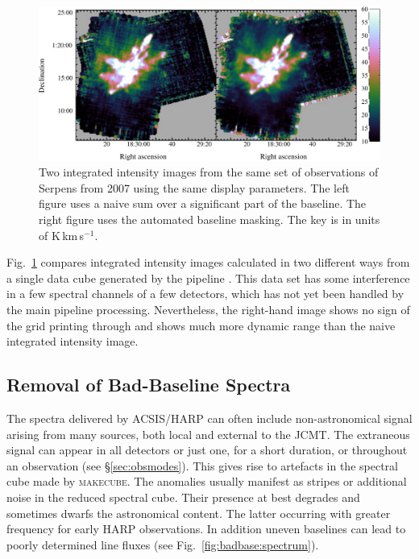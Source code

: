 \documentclass[a4paper,fleqn,usenatbib]{mnras}
\newcommand{\makecube}{\textsc{makecube}}
\begin{document}
\begin{figure}
\centering
\includegraphics[width=\textwidth]{integ_manual_auto}
\caption{Two integrated intensity images from the same set of
  observations of Serpens from 2007 using the same display
  parameters. The left figure uses a naive sum over a significant part
  of the baseline. The right figure uses the automated baseline
  masking. The key is in units of K\,km\,s$^{-1}$.}
\label{fig:integ}
\end{figure}

Fig.\ \ref{fig:integ} compares integrated intensity images calculated
in two different ways from a single data cube generated by the
pipeline \citep[see][for details of earlier
reductions of these data]{2010MNRAS.409.1412G,2010A&A...523A..29D}. This data set
has some interference in a few spectral channels of a few detectors,
which has not yet been handled by the main pipeline
processing. Nevertheless, the right-hand image shows no sign of the grid
printing through and shows much more dynamic range than the naive
integrated intensity image.

\subsection{Removal of Bad-Baseline Spectra}
\label{sec:badbase}

The spectra delivered by ACSIS/HARP can often include non-astronomical
signal arising from many sources, both local and external to the  JCMT. The
extraneous signal can appear in all detectors or just one, for a short
duration, or throughout an observation (see \S\ref{sec:obsmodes}).
This gives rise to artefacts in the spectral cube made by \makecube.  The anomalies
usually manifest as stripes or additional noise in the reduced
spectral cube.  Their presence at best degrades and sometimes dwarfs
the astronomical content.  The latter occurring with greater frequency
for early HARP observations.  In addition uneven baselines can lead
to poorly determined line fluxes (see Fig.~\ref{fig:badbase:spectrum}).
\end{document}
